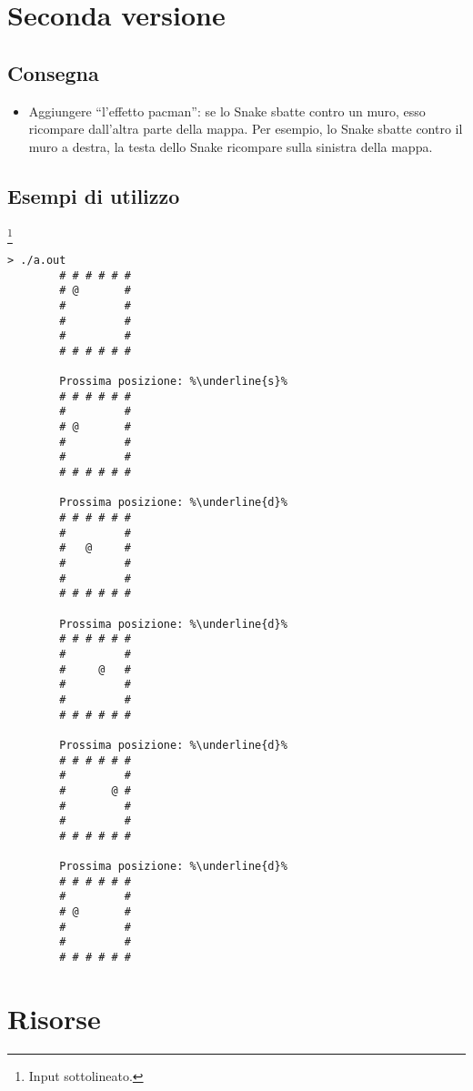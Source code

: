 \documentclass[addpoints,12pt,answers]{exam}
\begin{document}
	\section{Seconda versione}
	
	\subsection{Consegna}
	
	\begin{itemize}
		\item Aggiungere ``l'effetto pacman'': se lo Snake sbatte contro un muro, esso ricompare dall'altra parte della mappa. Per esempio, lo Snake sbatte contro il muro a destra, la testa dello Snake ricompare sulla sinistra della mappa.
	\end{itemize}
    
    \subsection{Esempi di utilizzo}
    \footnote{Input sottolineato.}
    
	\begin{lstlisting}[style=verbatim]
		> ./a.out 
		# # # # # # 
		# @       #
		#         #
		#         #
		#         #
		# # # # # # 
		
		Prossima posizione: %\underline{s}%
		# # # # # # 
		#         #
		# @       #
		#         #
		#         #
		# # # # # # 
		
		Prossima posizione: %\underline{d}%
		# # # # # # 
		#         #
		#   @     #
		#         #
		#         #
		# # # # # # 
		
		Prossima posizione: %\underline{d}%
		# # # # # # 
		#         #
		#     @   #
		#         #
		#         #
		# # # # # #
		
		Prossima posizione: %\underline{d}%
		# # # # # # 
		#         #
		#       @ #
		#         #
		#         #
		# # # # # #  
		
		Prossima posizione: %\underline{d}%
		# # # # # # 
		#         #
		# @       #
		#         #
		#         #
		# # # # # #  
	\end{lstlisting}
    
    \section{Risorse}
    \label{ch_res}
    
\end{document}
